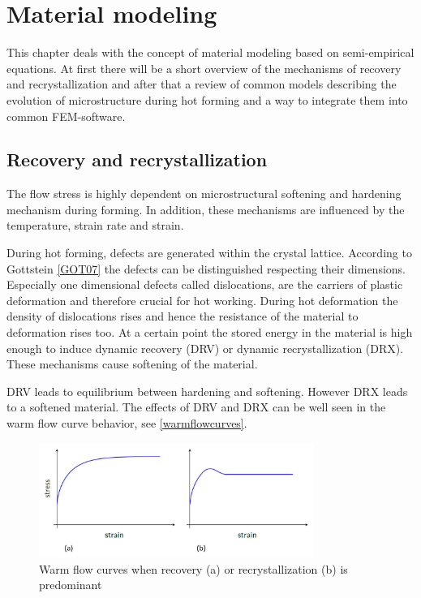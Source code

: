\section{Material modeling}
This chapter deals with the concept of material modeling based on semi-empirical equations. At first there will be a short overview of the mechanisms of recovery and recrystallization and after that a review of common models describing the evolution of microstructure during hot forming and a way to integrate them into common FEM-software.\par 

\subsection{Recovery and recrystallization}
The flow stress is highly dependent on microstructural softening and hardening mechanism during forming. In addition, these mechanisms are influenced by the temperature, strain rate and strain.\par 

During hot forming, defects are generated within the crystal lattice. According to Gottstein \ref{GOT07} the defects can be distinguished respecting their dimensions. Especially one dimensional defects called dislocations, are the carriers of plastic deformation and therefore crucial for hot working. During hot deformation the density of dislocations rises and hence the resistance of the material to deformation rises too. At a certain point the stored energy in the material is high enough to induce dynamic recovery (DRV) or dynamic recrystallization (DRX). These mechanisms cause softening of the material.\par 

DRV leads to equilibrium between hardening and softening. However DRX leads to a softened material. The effects of DRV and DRX can be well seen in the warm flow curve behavior, see \ref{warmflowcurves}.

\begin{figure}[htbp]
 \centering
 \includegraphics[width=0.8\textwidth]{images/warmflowcurves}
 \caption{Warm flow curves when recovery (a) or recrystallization (b) is predominant \cite{LOH10}}
 \label{img:warmflowcurves}
\end{figure}

